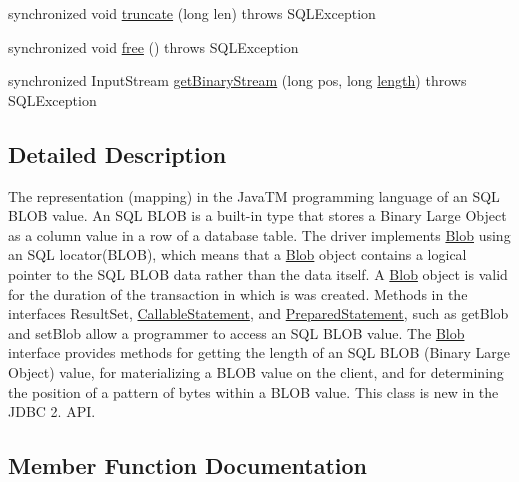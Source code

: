 \begin{DoxyCompactItemize}
\item 
synchronized void \mbox{\hyperlink{classcom_1_1mysql_1_1jdbc_1_1_blob_ac1341e0ed7c4ba983773aee70c265cb9}{truncate}} (long len)  throws S\+Q\+L\+Exception 
\item 
synchronized void \mbox{\hyperlink{classcom_1_1mysql_1_1jdbc_1_1_blob_a7405044926c16084af58e0666a33eddc}{free}} ()  throws S\+Q\+L\+Exception 
\item 
synchronized Input\+Stream \mbox{\hyperlink{classcom_1_1mysql_1_1jdbc_1_1_blob_a5c5e58e0fee91fa04afad866e2c87289}{get\+Binary\+Stream}} (long pos, long \mbox{\hyperlink{classcom_1_1mysql_1_1jdbc_1_1_blob_aed91f2ff2c2217b4c52294d356253e63}{length}})  throws S\+Q\+L\+Exception 
\end{DoxyCompactItemize}


\subsection{Detailed Description}
The representation (mapping) in the Java\+TM programming language of an S\+QL B\+L\+OB value. An S\+QL B\+L\+OB is a built-\/in type that stores a Binary Large Object as a column value in a row of a database table. The driver implements \mbox{\hyperlink{classcom_1_1mysql_1_1jdbc_1_1_blob}{Blob}} using an S\+QL locator(\+B\+L\+O\+B), which means that a \mbox{\hyperlink{classcom_1_1mysql_1_1jdbc_1_1_blob}{Blob}} object contains a logical pointer to the S\+QL B\+L\+OB data rather than the data itself. A \mbox{\hyperlink{classcom_1_1mysql_1_1jdbc_1_1_blob}{Blob}} object is valid for the duration of the transaction in which is was created. Methods in the interfaces Result\+Set, \mbox{\hyperlink{classcom_1_1mysql_1_1jdbc_1_1_callable_statement}{Callable\+Statement}}, and \mbox{\hyperlink{classcom_1_1mysql_1_1jdbc_1_1_prepared_statement}{Prepared\+Statement}}, such as get\+Blob and set\+Blob allow a programmer to access an S\+QL B\+L\+OB value. The \mbox{\hyperlink{classcom_1_1mysql_1_1jdbc_1_1_blob}{Blob}} interface provides methods for getting the length of an S\+QL B\+L\+OB (Binary Large Object) value, for materializing a B\+L\+OB value on the client, and for determining the position of a pattern of bytes within a B\+L\+OB value. This class is new in the J\+D\+BC 2. A\+PI. 

\subsection{Member Function Documentation}
\mbox{\label{classcom_1_1mysql_1_1jdbc_1_1_blob_a7405044926c16084af58e0666a33eddc}} 
